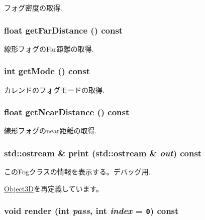 フォグ密度の取得. \hypertarget{classm3g_1_1Fog_90df17252a921929fce6a5e92aed4021}{
\subsubsection[{getFarDistance}]{\setlength{\rightskip}{0pt plus 5cm}float getFarDistance () const}}
\label{classm3g_1_1Fog_90df17252a921929fce6a5e92aed4021}


線形フォグのFar距離の取得. \hypertarget{classm3g_1_1Fog_d4ce4524e4751fe5e3cfb8c270347d54}{
\subsubsection[{getMode}]{\setlength{\rightskip}{0pt plus 5cm}int getMode () const}}
\label{classm3g_1_1Fog_d4ce4524e4751fe5e3cfb8c270347d54}


カレンドのフォグモードの取得. \hypertarget{classm3g_1_1Fog_cd7a642e43bf99b0e1c5c24d3c6424a2}{
\subsubsection[{getNearDistance}]{\setlength{\rightskip}{0pt plus 5cm}float getNearDistance () const}}
\label{classm3g_1_1Fog_cd7a642e43bf99b0e1c5c24d3c6424a2}


線形フォグのnear距離の取得. \hypertarget{classm3g_1_1Fog_6fea17fa1532df3794f8cb39cb4f911f}{
\subsubsection[{print}]{\setlength{\rightskip}{0pt plus 5cm}std::ostream \& print (std::ostream \& {\em out}) const}}
\label{classm3g_1_1Fog_6fea17fa1532df3794f8cb39cb4f911f}


このFogクラスの情報を表示する。デバッグ用. 

\hyperlink{classm3g_1_1Object3D_6fea17fa1532df3794f8cb39cb4f911f}{Object3D}を再定義しています。\hypertarget{classm3g_1_1Fog_1efcb1973989d9963d5bd6d03065d389}{
\subsubsection[{render}]{\setlength{\rightskip}{0pt plus 5cm}void render (int {\em pass}, \/  int {\em index} = {\tt 0}) const}}
\label{classm3g_1_1Fog_1efcb1973989d9963d5bd6d03065d389}


